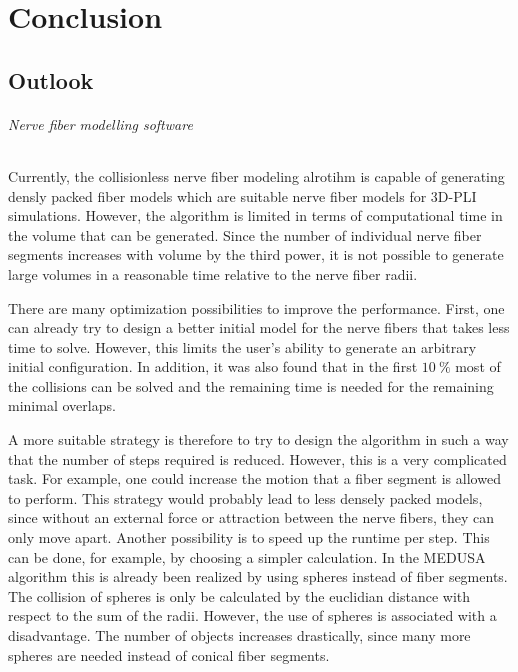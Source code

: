 \newpage\null\thispagestyle{empty}\newpage
\clearpage{\thispagestyle{empty}\cleardoublepage}
\part{Conclusion}
% 
% 
% 
\setcounter{chapter}{8}
\chapter{Outlook}
\label{sec:outlook}
% 
\paragraph{Nerve fiber modelling software}
% 
Currently, the collisionless nerve fiber modeling alrotihm is capable of generating densly packed fiber models which are suitable nerve fiber models for \ac{3D-PLI} simulations.
However, the algorithm is limited in terms of computational time in the volume that can be generated.
Since the number of individual nerve fiber segments increases with volume by the third power, it is not possible to generate large volumes in a reasonable time relative to the nerve fiber radii.
\par
% 
There are many optimization possibilities to improve the performance.
First, one can already try to design a better initial model for the nerve fibers that takes less time to solve.
However, this limits the user's ability to generate an arbitrary initial configuration. 
In addition, it was also found that in the first $\SI{10}{\percent}$ most of the collisions can be solved and the remaining time is needed for the remaining minimal overlaps.
\par
% 
A more suitable strategy is therefore to try to design the algorithm in such a way that the number of steps required is reduced.
However, this is a very complicated task.
For example, one could increase the motion that a fiber segment is allowed to perform.
This strategy would probably lead to less densely packed models, since without an external force or attraction between the nerve fibers, they can only move apart.
Another possibility is to speed up the runtime per step.
This can be done, for example, by choosing a simpler calculation.
In the \ac{MEDUSA} algorithm this is already been realized by using spheres instead of fiber segments.
The collision of spheres is only be calculated by the euclidian distance with respect to the sum of the radii.
However, the use of spheres is associated with a disadvantage.
The number of objects increases drastically, since many more spheres are needed instead of conical fiber segments.
